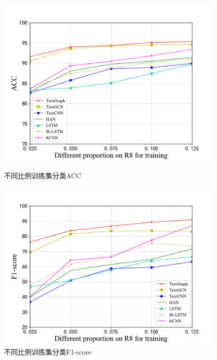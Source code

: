 \begin{figure}[htb]
    \begin{minipage}[t]{0.5\linewidth}
    \centering
    \includegraphics[width=1\textwidth]{pic/R8_acc.pdf}
    \caption{不同比例训练集分类ACC}
    \label{R8_acc}
    \end{minipage}
    \quad
    \begin{minipage}[t]{0.5\linewidth}
    \centering
    \includegraphics[width=1\textwidth]{pic/R8_f1-score.pdf}
    \caption{不同比例训练集分类F1-score}
    \label{R8_f1-score}
    \end{minipage}
\end{figure}

